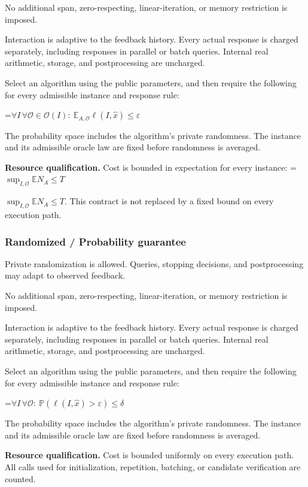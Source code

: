 \documentclass[10pt,a4paper]{article}
\newcommand{\AtlasMath}[1]{\par\begingroup\centering\setbox0=\hbox{$\displaystyle #1$}\ifdim\wd0>1.4\linewidth\typeout{ATLAS WIDE FORMULA: \the\wd0}\fi\ifdim\wd0>\linewidth\resizebox{\linewidth}{!}{\box0}\else\box0\fi\par\endgroup}
\newcommand{\AtlasInlineMath}[1]{\begingroup\setbox0=\hbox{$#1$}\ifdim\wd0>.4\linewidth\endgroup\AtlasMath{#1}\else\endgroup$#1$\fi}
\begin{document}
No additional span, zero-respecting, linear-iteration, or memory restriction is imposed.

Interaction is adaptive to the feedback history. Every actual response is charged separately, including responses in parallel or batch queries. Internal real arithmetic, storage, and postprocessing are uncharged.

Select an algorithm using the public parameters, and then require the following for every admissible instance and response rule:


\AtlasMath{\forall I\,\forall\mathcal{O}\in\mathcal{O}(I):\ \mathbb{E}_{A,\mathcal{O}}\ell(I,\widehat{x})\le\varepsilon}


The probability space includes the algorithm's private randomness. The instance and its admissible oracle law are fixed before randomness is averaged.

\textbf{Resource qualification.} Cost is bounded in expectation for every instance: \AtlasInlineMath{\sup_{I,\mathcal O}\mathbb E N_A\le T}. This contract is not replaced by a fixed bound on every execution path.

\subsubsection{Randomized / Probability guarantee}
Private randomization is allowed. Queries, stopping decisions, and postprocessing may adapt to observed feedback.

No additional span, zero-respecting, linear-iteration, or memory restriction is imposed.

Interaction is adaptive to the feedback history. Every actual response is charged separately, including responses in parallel or batch queries. Internal real arithmetic, storage, and postprocessing are uncharged.

Select an algorithm using the public parameters, and then require the following for every admissible instance and response rule:


\AtlasMath{\forall I\,\forall\mathcal{O}:\ \mathbb{P}(\ell(I,\widehat{x})>\varepsilon)\le\delta}


The probability space includes the algorithm's private randomness. The instance and its admissible oracle law are fixed before randomness is averaged.

\textbf{Resource qualification.} Cost is bounded uniformly on every execution path. All calls used for initialization, repetition, batching, or candidate verification are counted.
\end{document}

